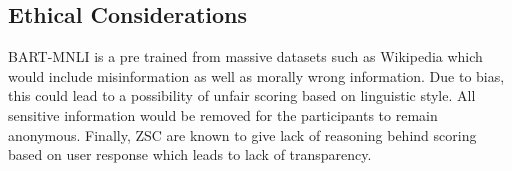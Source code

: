 \subsection{Ethical Considerations}
\par BART-MNLI is a pre trained from massive datasets such as Wikipedia which would include misinformation as well as morally wrong information. Due to bias, this could lead to a possibility of unfair scoring based on linguistic style. All sensitive information would be removed for the participants to remain anonymous. Finally, ZSC are known to give lack of reasoning behind scoring based on user response which leads to lack of transparency. 